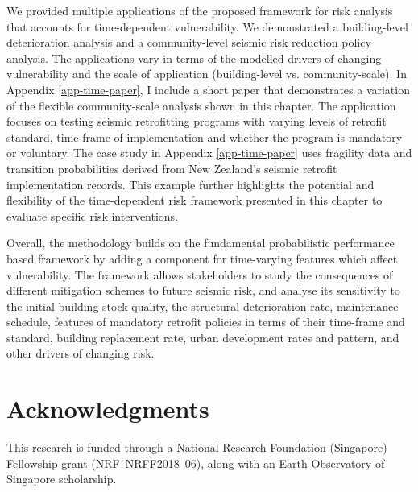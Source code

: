We provided multiple applications of the proposed framework for risk analysis that accounts for time-dependent vulnerability. We demonstrated a building-level deterioration analysis and a community-level seismic risk reduction policy analysis. The applications vary in terms of the modelled drivers of changing vulnerability and the scale of application (building-level vs. community-scale). In Appendix \ref{app-time-paper}, I include a short paper that demonstrates a variation of the flexible community-scale analysis shown in this chapter. The application focuses on testing seismic retrofitting programs with varying levels of retrofit standard, time-frame of implementation and whether the program is mandatory or voluntary. The case study in Appendix \ref{app-time-paper} uses fragility data and transition probabilities derived from New Zealand's seismic retrofit implementation records. This example further highlights the potential and flexibility of the time-dependent risk framework presented in this chapter to evaluate specific risk interventions.

Overall, the methodology builds on the fundamental probabilistic performance based framework by adding a component for time-varying features which affect vulnerability. The framework allows stakeholders to study the consequences of different mitigation schemes to future seismic risk, and analyse its sensitivity to the initial building stock quality, the structural deterioration rate, maintenance schedule, features of mandatory retrofit policies in terms of their time-frame and standard, building replacement rate, urban development rates and pattern, and other drivers of changing risk.


\section{Acknowledgments}
This research is funded through a National Research Foundation (Singapore) Fellowship grant (NRF–NRFF2018–06), along with an Earth Observatory of Singapore scholarship.



